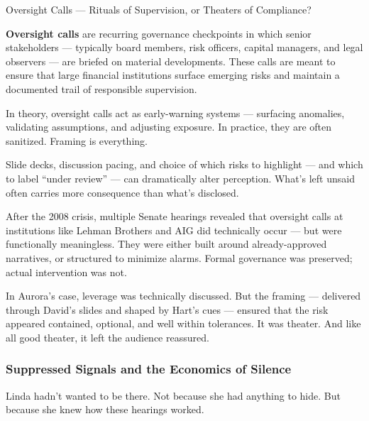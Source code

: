\begin{TechnicalSidebar}{Oversight Calls — Rituals of Supervision, or Theaters of Compliance?}

  \textbf{Oversight calls} are recurring governance checkpoints in which senior stakeholders — typically board 
  members, risk officers, capital managers, and legal observers — are briefed on material developments. These 
  calls are meant to ensure that large financial institutions surface emerging risks and maintain a documented 
  trail of responsible supervision.

  \medskip
  
  In theory, oversight calls act as early-warning systems — surfacing anomalies, validating assumptions, and 
  adjusting exposure. In practice, they are often sanitized. Framing is everything.

  \medskip
  
  Slide decks, discussion pacing, and choice of which risks to highlight — and which to label ``under review'' — 
  can dramatically alter perception. What’s left unsaid often carries more consequence than what’s disclosed.

  \medskip
  
  After the 2008 crisis, multiple Senate hearings revealed that oversight calls at institutions like Lehman 
  Brothers and AIG did technically occur — but were functionally meaningless. They were either built around 
  already-approved narratives, or structured to minimize alarms. Formal governance was preserved; actual 
  intervention was not.

  \medskip
  
  In Aurora’s case, leverage was technically discussed. But the framing — delivered through David’s slides 
  and shaped by Hart’s cues — ensured that the risk appeared contained, optional, and well within tolerances. 
  It was theater. And like all good theater, it left the audience reassured.
  
\end{TechnicalSidebar}


\medskip

\subsubsection{Suppressed Signals and the Economics of Silence}

Linda hadn’t wanted to be there.
Not because she had anything to hide.
But because she knew how these hearings worked.

